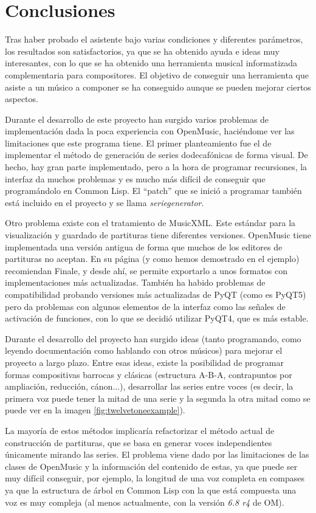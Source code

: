 \documentclass[a4paper,openany,oneside,12pt]{book}
\begin{document}
\chapter{Conclusiones}\label{conclusiones}
Tras haber probado el asistente bajo varias condiciones y diferentes parámetros, los resultados son satisfactorios, ya que se ha obtenido ayuda e ideas muy interesantes, con lo que se ha obtenido una herramienta musical informatizada complementaria para compositores. El objetivo de conseguir una herramienta que asiste a un músico a componer se ha conseguido aunque se pueden mejorar ciertos aspectos.

Durante el desarrollo de este proyecto han surgido varios problemas de implementación dada la poca experiencia con OpenMusic, haciéndome ver las limitaciones que este programa tiene. El primer planteamiento fue el de implementar el método de generación de series dodecafónicas de forma visual. De hecho, hay gran parte implementado, pero a la hora de programar recursiones, la interfaz da muchos problemas y es mucho más difícil de conseguir que programándolo en Common Lisp. El ``patch'' que se inició a programar también está incluido en el proyecto y se llama \emph{seriegenerator}.

Otro problema existe con el tratamiento de MusicXML. Este estándar para la visualización y guardado de partituras tiene diferentes versiones. OpenMusic tiene implementada una versión antigua de forma que muchos de los editores de partituras no aceptan. En su página (y como hemos demostrado en el ejemplo) recomiendan Finale, y desde ahí, se permite exportarlo a unos formatos con implementaciones más actualizadas. También ha habido problemas de compatibilidad probando versiones más actualizadas de PyQT (como es PyQT5) pero da problemas con algunos elementos de la interfaz como las señales de activación de funciones, con lo que se decidió utilizar PyQT4, que es más estable.

Durante el desarrollo del proyecto han surgido ideas (tanto programando, como leyendo documentación como hablando con otros músicos) para mejorar el proyecto a largo plazo. Entre esas ideas, existe la posibilidad de programar formas compositivas barrocas y clásicas (estructura A-B-A, contrapuntos por ampliación, reducción, cánon...), desarrollar las series entre voces (es decir, la primera voz puede tener la mitad de una serie y la segunda la otra mitad como se puede ver en la imagen \ref{fig:twelvetoneexample}).

La mayoría de estos métodos implicaría refactorizar el método actual de construcción de partituras, que se basa en generar voces independientes únicamente mirando las series. El problema viene dado por las limitaciones de las clases de OpenMusic y la información del contenido de estas, ya que puede ser muy difícil conseguir, por ejemplo, la longitud de una voz completa en compases ya que la estructura de árbol en Common Lisp con la que está compuesta una voz es muy compleja (al menos actualmente, con la versión \emph{6.8 r4} de OM).
\end{document}
